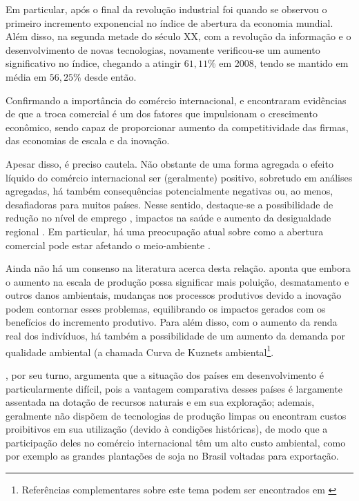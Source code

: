 Em particular, após o final da revolução industrial foi quando se observou o primeiro incremento exponencial no índice de abertura da economia mundial. Além disso, na segunda metade do século XX, com a revolução da informação e o desenvolvimento de novas tecnologias, novamente verificou-se um aumento significativo no índice, chegando a atingir $61,11\%$ em 2008, tendo se mantido em média em $56,25\%$ desde então. 

Confirmando a importância do comércio internacional,  e  encontraram evidências de que a troca comercial é um dos fatores que impulsionam o crescimento econômico, sendo capaz de proporcionar aumento da competitividade das firmas, das economias de escala e da inovação. 

Apesar disso, é preciso cautela. Não obstante de uma forma agregada o efeito líquido do comércio internacional ser (geralmente) positivo, sobretudo em análises agregadas, há também consequências potencialmente negativas ou, ao menos, desafiadoras para muitos países. Nesse sentido, destaque-se a possibilidade de redução no nível de emprego \cite{Tuhin2015}, impactos na saúde \cite{Smith2015} e aumento da desigualdade regional \cite{Daumal2010, Pavcnik2017}. Em particular, há uma preocupação atual sobre como a abertura comercial pode estar afetando o meio-ambiente \cite{Frankel2008, Williams1993}.

Ainda não há um consenso na literatura acerca desta relação.  aponta que embora o aumento na escala de produção possa significar mais poluição, desmatamento e outros danos ambientais, mudanças nos processos produtivos devido a inovação podem contornar esses problemas, equilibrando os impactos gerados com os benefícios do incremento produtivo. Para além disso, com o aumento da renda real dos indivíduos, há também a possibilidade de um aumento da demanda por qualidade ambiental (a chamada Curva de Kuznets ambiental\footnote{Referências complementares sobre este tema podem ser encontrados em \cite{Stern2004, Carvalho2010, Carvalho2013}}. 

, por seu turno, argumenta que a situação dos países em desenvolvimento é particularmente difícil, pois a vantagem comparativa desses países é largamente assentada na dotação de recursos naturais e em sua exploração; ademais, geralmente não dispõem de tecnologias de produção limpas ou encontram custos proibitivos em sua utilização (devido à condições históricas), de modo que a participação deles no comércio internacional têm um alto custo ambiental, como por exemplo as grandes plantações de soja no Brasil voltadas para exportação.

